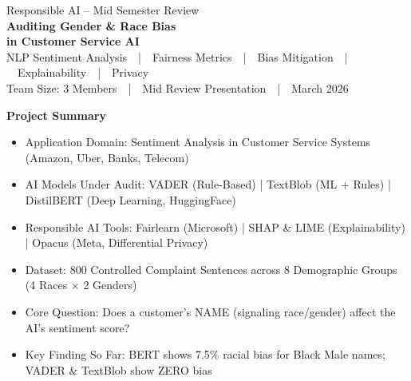 \documentclass[aspectratio=43,11pt]{beamer}
\begin{document}
{
\begin{frame}[plain]
\vspace{-0.5cm}

\vspace{-0.3cm}
\begin{center}
{\scriptsize\color{SubtleBlue} Responsible AI -- Mid Semester Review}\\[8pt]
{\LARGE\bfseries\color{white} Auditing Gender \& Race Bias}\\[4pt]
{\Large\bfseries\color{white} in Customer Service AI}\\[10pt]
{\scriptsize\color{SubtleBlue} NLP Sentiment Analysis~~|~~Fairness Metrics~~|~~Bias Mitigation~~|~~Explainability~~|~~Privacy}\\[6pt]
{\scriptsize\color{SubtleBlue} Team Size: 3 Members~~|~~Mid Review Presentation~~|~~March 2026}
\end{center}

\vspace{0.5cm}
{\normalsize\bfseries\color{DarkBlue} Project Summary}\\[4pt]
{\small\color{GrayText}
\begin{itemize}[leftmargin=1.2em]
  \item Application Domain: Sentiment Analysis in Customer Service Systems (Amazon, Uber, Banks, Telecom)
  \item AI Models Under Audit: VADER (Rule-Based) | TextBlob (ML + Rules) | DistilBERT (Deep Learning, HuggingFace)
  \item Responsible AI Tools: Fairlearn (Microsoft) | SHAP \& LIME (Explainability) | Opacus (Meta, Differential Privacy)
  \item Dataset: 800 Controlled Complaint Sentences across 8 Demographic Groups (4 Races $\times$ 2 Genders)
  \item Core Question: Does a customer's NAME (signaling race/gender) affect the AI's sentiment score?
  \item Key Finding So Far: BERT shows 7.5\% racial bias for Black Male names; VADER \& TextBlob show ZERO bias
\end{itemize}}
\end{frame}
}
\end{document}
